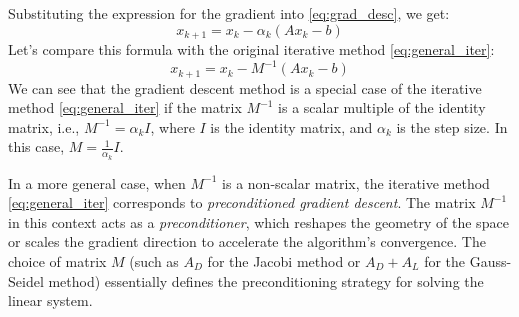 \documentclass[11pt,a4paper,reqno]{article}
\begin{document}
Substituting the expression for the gradient into \eqref{eq:grad_desc}, we get:
\begin{equation*}
  x_{k+1} = x_k - \alpha_k (Ax_k - b)
\end{equation*}
Let's compare this formula with the original iterative method \eqref{eq:general_iter}:
\begin{equation*}
  x_{k+1} = x_k - M^{-1}(Ax_k-b)
\end{equation*}
We can see that the gradient descent method is a special case of the iterative method \eqref{eq:general_iter} if the matrix $M^{-1}$ is a scalar multiple of the identity matrix, i.e., $M^{-1} = \alpha_k I$, where $I$ is the identity matrix, and $\alpha_k$ is the step size. In this case, $M = \frac{1}{\alpha_k}I$.

In a more general case, when $M^{-1}$ is a non-scalar matrix, the iterative method \eqref{eq:general_iter} corresponds to \textit{preconditioned gradient descent}. The matrix $M^{-1}$ in this context acts as a \textit{preconditioner}, which reshapes the geometry of the space or scales the gradient direction to accelerate the algorithm's convergence. The choice of matrix $M$ (such as $A_D$ for the Jacobi method or $A_D+A_L$ for the Gauss-Seidel method) essentially defines the preconditioning strategy for solving the linear system.
\end{document}

